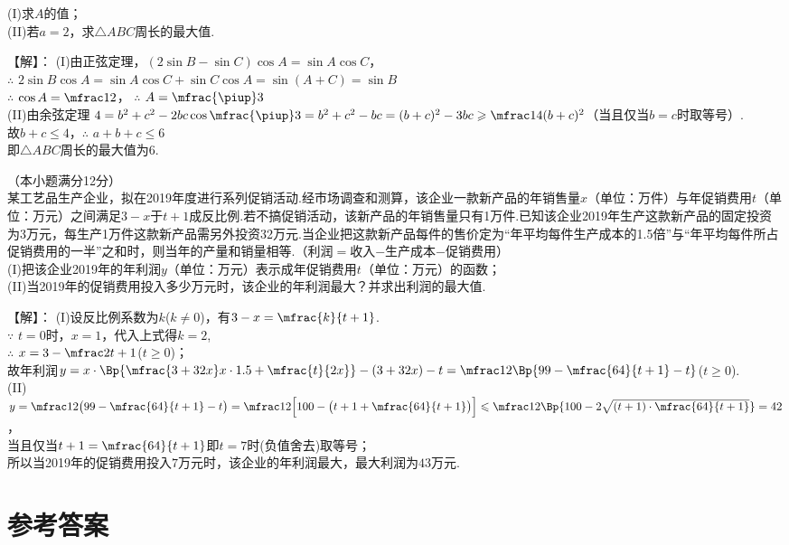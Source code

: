 \begin{exercise}
    (I)求$A$的值；\\
    (II)若$a=2$，求$\triangle{ABC}$周长的最大值.
    \begin{answer}
      【解】：
      (I)由正弦定理，$(2\sin B-\sin C)\cos A=\sin A \cos C$，\\
         $\therefore$ $2\sin B\cos A=\sin A \cos C+\sin C \cos A=\sin(A+C)=\sin B$\\
        $\therefore$ $\cos A=\mfrac12$， $\therefore$ $A=\mfrac{\piup}3$\\
      (II)由余弦定理 $4=b^2+c^2-2bc\cos\mfrac{\piup}3
          =b^2+c^2-bc=(b+c)^2-3bc\geqslant \mfrac14(b+c)^2$（当且仅当$b=c$时取等号）.\\
          故$b+c\leqslant4$，$\therefore$ $a+b+c\leqslant6$\\
          即$\triangle{ABC}$周长的最大值为6.
    \end{answer}
  \vspace{7cm}
  \item%
    （本小题满分12分）\\
    某工艺品生产企业，拟在2019年度进行系列促销活动.经市场调查和测算，该企业一款新产品的年销售量$x$（单位：万件）与年促销费用$t$（单位：万元）之间满足$3-x$于$t+1$成反比例.若不搞促销活动，该新产品的年销售量只有1万件.已知该企业2019年生产这款新产品的固定投资为3万元，每生产1万件这款新产品需另外投资32万元.当企业把这款新产品每件的售价定为“年平均每件生产成本的1.5倍”与“年平均每件所占促销费用的一半”之和时，则当年的产量和销量相等.（利润$=$收入$-$生产成本$-$促销费用）\\
    (I)把该企业2019年的年利润$y$（单位：万元）表示成年促销费用$t$（单位：万元）的函数；\\
    (II)当2019年的促销费用投入多少万元时，该企业的年利润最大？并求出利润的最大值.
    \begin{answer}
      【解】：
      (I)设反比例系数为$k$($k\neq0$)，有$3-x=\mfrac{k}{t+1}$.\\
        $\because$ $t=0$时，$x=1$，代入上式得$k=2$,\\
        $\therefore$ $x=3-\mfrac2{t+1}$($t\geqslant0$)；\\
        故年利润$y=x\cdot\Bp{\mfrac{3+32x}x\cdot1.5+\mfrac{t}{2x}}-(3+32x)-t
                 =\mfrac12\Bp{99-\mfrac{64}{t+1}-t}$($t\geqslant0$).\\
      (II)$y=\mfrac12\bigl(99-\mfrac{64}{t+1}-t\bigr)
            =\mfrac12\Bigl[100-\bigl(t+1+\mfrac{64}{t+1}\bigr)\Bigr]
            \leqslant \mfrac12\Bp{100-2\sqrt{(t+1)\cdot\mfrac{64}{t+1}}}=42$，\\
          当且仅当$t+1=\mfrac{64}{t+1}$即$t=7$时(负值舍去)取等号；\\
          所以当2019年的促销费用投入$7$万元时，该企业的年利润最大，最大利润为$43$万元.
    \end{answer}

\end{exercise}
\stopexercise
\hspace{2em}
\newpage
\part{参考答案}
\begin{multicols}{2}
  \printanswer
\end{multicols}
